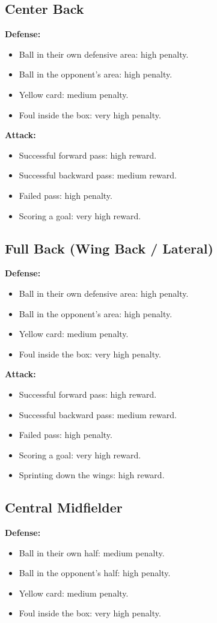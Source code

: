 \documentclass{article}
\begin{document}
\subsection*{Center Back}
\textbf{Defense:}
\begin{itemize}
    \item Ball in their own defensive area: high penalty.
    \item Ball in the opponent's area: high penalty.
    \item Yellow card: medium penalty.
    \item Foul inside the box: very high penalty.
\end{itemize}

\textbf{Attack:}
\begin{itemize}
    \item Successful forward pass: high reward.
    \item Successful backward pass: medium reward.
    \item Failed pass: high penalty.
    \item Scoring a goal: very high reward.
\end{itemize}

\subsection*{Full Back (Wing Back / Lateral)}
\textbf{Defense:}
\begin{itemize}
    \item Ball in their own defensive area: high penalty.
    \item Ball in the opponent's area: high penalty.
    \item Yellow card: medium penalty.
    \item Foul inside the box: very high penalty.
\end{itemize}

\textbf{Attack:}
\begin{itemize}
    \item Successful forward pass: high reward.
    \item Successful backward pass: medium reward.
    \item Failed pass: high penalty.
    \item Scoring a goal: very high reward.
    \item Sprinting down the wings: high reward.
\end{itemize}

\subsection*{Central Midfielder}
\textbf{Defense:}
\begin{itemize}
    \item Ball in their own half: medium penalty.
    \item Ball in the opponent's half: high penalty.
    \item Yellow card: medium penalty.
    \item Foul inside the box: very high penalty.
\end{itemize}
\end{document}
